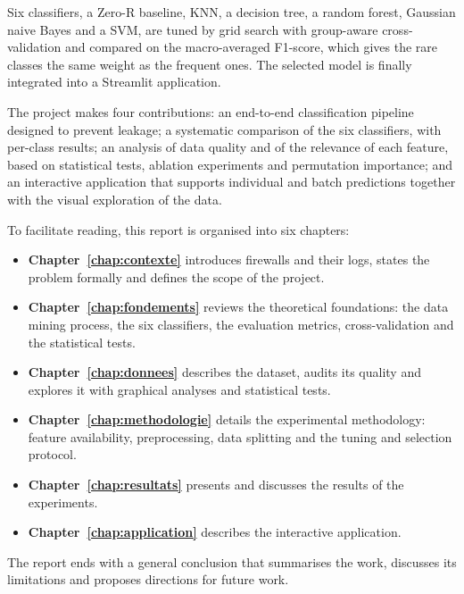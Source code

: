 Six classifiers, a Zero-R baseline, \ac{KNN}, a decision tree, a random forest, Gaussian naive Bayes and a \ac{SVM}, are tuned by grid search with group-aware cross-validation and compared on the macro-averaged F1-score, which gives the rare classes the same weight as the frequent ones. The selected model is finally integrated into a Streamlit application.

The project makes four contributions: an end-to-end classification pipeline designed to prevent leakage; a systematic comparison of the six classifiers, with per-class results; an analysis of data quality and of the relevance of each feature, based on statistical tests, ablation experiments and permutation importance; and an interactive application that supports individual and batch predictions together with the visual exploration of the data.

To facilitate reading, this report is organised into six chapters:
\begin{itemize}
  \item[$-$] \textbf{Chapter~\ref{chap:contexte}} introduces firewalls and their logs, states the problem formally and defines the scope of the project.
  \item[$-$] \textbf{Chapter~\ref{chap:fondements}} reviews the theoretical foundations: the data mining process, the six classifiers, the evaluation metrics, cross-validation and the statistical tests.
  \item[$-$] \textbf{Chapter~\ref{chap:donnees}} describes the dataset, audits its quality and explores it with graphical analyses and statistical tests.
  \item[$-$] \textbf{Chapter~\ref{chap:methodologie}} details the experimental methodology: feature availability, preprocessing, data splitting and the tuning and selection protocol.
  \item[$-$] \textbf{Chapter~\ref{chap:resultats}} presents and discusses the results of the experiments.
  \item[$-$] \textbf{Chapter~\ref{chap:application}} describes the interactive application.
\end{itemize}
The report ends with a general conclusion that summarises the work, discusses its limitations and proposes directions for future work.